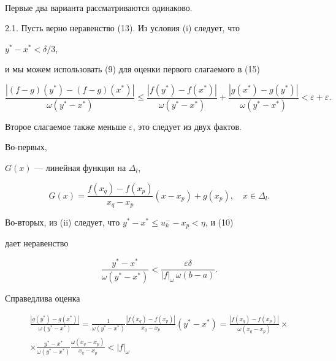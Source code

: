 \begin{pf}
\begin{align}
\end{align}


Первые два варианта рассматриваются одинаково.





2.1. Пусть верно неравенство (13). Из условия (i) следует, что


$y^*-x^*<\delta/3$,


и мы можем использовать (9) для оценки первого слагаемого в (15)


\begin{equation}


\frac{|(f-g)(y^*)-(f-g)(x^*)|}{\omega(y^*-x^*)} \le


\frac{|f(y^*)-f(x^*)|}{\omega(y^*-x^*)}+


\frac{|g(x^*)-g(y^*)|}{\omega(y^*-x^*)}


<\varepsilon+\varepsilon.


\end{equation}


Второе слагаемое также меньше $\varepsilon$, это следует из двух фактов.


Во-первых,


$G(x)$ --- линейная функция на $\Delta_l$,


$$


G(x)=\frac{f(x_q)-f(x_p)}{x_q-x_p}(x-x_p)+g(x_p),\quad


x\in \Delta_l.


$$


Во-вторых, из (ii) следует, что $y^*-x^*\le u^-_k-x_p<\eta$, и (10)


дает неравенство


$$


\frac{y^*-x^*}{\omega(y^*-x^*)} <


\frac{\varepsilon\delta}{|f|_\omega\,\omega(b-a)}.


$$


Справедлива оценка


\begin{multline*}


\frac{|g(y^*)-g(x^*)|}{\omega(y^*-x^*)}=


\frac{1}{\omega(y^*-x^*)}


\frac{|f(x_q)-f(x_p)|}{x_q-x_p}(y^*-x^*)=


\frac{|f(x_q)-f(x_p)|}{\omega(x_q-x_p)}\times \\


\times \frac{y^*-x^*}{\omega(y^*-x^*)}


\frac{\omega(x_q-x_p)}{x_q-x_p}< |f|_\omega\,



\end{multline*}
\end{pf}
